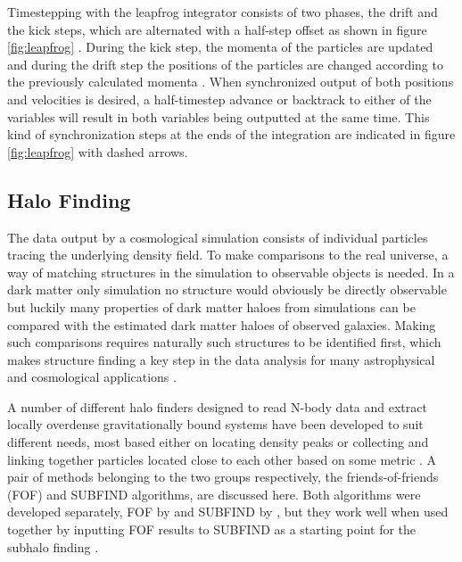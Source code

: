 \documentclass[english, oneside]{HYgradu}
\begin{document}
Timestepping with the leapfrog integrator consists of two phases, the drift and the kick steps, which are alternated with a half-step offset as shown in figure \ref{fig:leapfrog} \citep{binney2008galactic}. During the kick step, the momenta of the particles are updated and during the drift step the positions of the particles are changed according to the previously calculated momenta \citep{binney2008galactic}. When synchronized output of both positions and velocities is desired, a half-timestep advance or backtrack to either of the variables will result in both variables being outputted at the same time. This kind of synchronization steps at the ends of the integration are indicated in figure \ref{fig:leapfrog} with dashed arrows.




\subsection{Halo Finding} \label{sect:halofinding}
The data output by a cosmological simulation consists of individual particles tracing the underlying density field. To make comparisons to the real universe, a way of matching structures in the simulation to observable objects is needed. In a dark matter only simulation no structure would obviously be directly observable but luckily many properties of dark matter haloes from simulations can be compared with the estimated dark matter haloes of observed galaxies. %
Making such comparisons requires naturally such structures to be identified first, which makes structure finding a key step in the data analysis for many astrophysical and cosmological applications \citep{knebe2013structure}.

A number of different halo finders designed to read N-body data and extract locally overdense gravitationally bound systems have been developed to suit different needs, most based either on locating density peaks or collecting and linking together particles located close to each other based on some metric \citep{knebe2013structure}. A pair of methods belonging to the two groups respectively, the friends-of-friends (FOF) and SUBFIND algorithms, are discussed here. Both algorithms were developed separately, FOF by \citet{davis1985evolution} and SUBFIND by \citet{springel2001populating}, but they work well when used together by inputting FOF results to SUBFIND as a starting point for the subhalo finding \citep{springel2005cosmological}.
\end{document}
